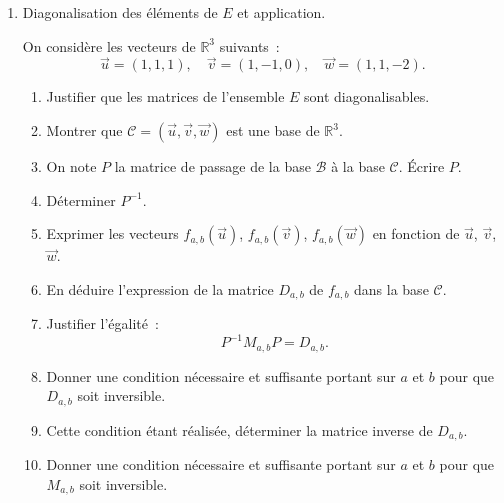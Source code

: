 \begin{exercice}
\begin{enumerate}
\item Diagonalisation des \'{e}l\'{e}ments de $E$ et application.

On consid\`ere les vecteurs de $\mathbb{R}^3$ suivants~: 
\begin{equation*}
\vec{u}=(1,1,1), \quad \vec{v}=(1,-1,0), \quad \vec{w}=(1,1,-2).
\end{equation*}

\begin{enumerate}
\item Justifier que les matrices de l'ensemble $E$ sont diagonalisables.

\item Montrer que $\mathcal{C}=\left( \vec{u},\vec{v},\vec{w}\right) $ est
une base de $\mathbb{R}^{3}$.

\item On note $P$ la matrice de passage de la base $\mathcal{B}$ \`{a} la
base $\mathcal{C}$. \'{E}crire $P$.

\item D\'{e}terminer $P^{-1}$.

\item Exprimer les vecteurs $f_{a,b}\left( \vec{u}\right) $, $f_{a,b}\left( 
\vec{v}\right) $, $f_{a,b}\left( \vec{w}\right) $ en fonction de $\vec{u}$, $%
\vec{v}$, $\vec{w}$.

\item En d\'{e}duire l'expression de la matrice $D_{a,b}$ de $f_{a,b}$ dans
la base $\mathcal{C}$.

\item Justifier l'\'{e}galit\'{e}~: 
\begin{equation*}
P^{-1}M_{a,b}P=D_{a,b}.
\end{equation*}

\item Donner une condition n\'{e}cessaire et suffisante portant sur $a$ et $%
b $ pour que $D_{a,b}$ soit inversible.

\item Cette condition \'{e}tant r\'{e}alis\'{e}e, d\'{e}terminer la matrice
inverse de $D_{a,b}$.

\item Donner une condition n\'{e}cessaire et suffisante portant sur $a$ et $%
b $ pour que $M_{a,b}$ soit inversible.
\end{enumerate}

\end{enumerate}

\end{exercice}





